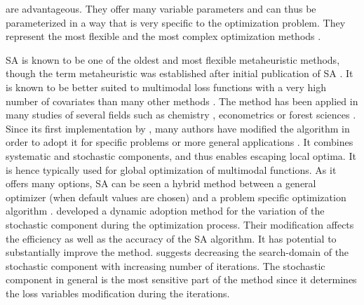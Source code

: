 are advantageous. They offer many variable parameters and can thus be parameterized in a way that is very specific to the optimization problem. They represent the most flexible and the most complex optimization methods \citep{blum_2003}.

SA \citep{kirkpatrick_1983} is known to be one of the oldest and most flexible metaheuristic methods, though the term metaheuristic was established after initial publication of SA \citep{blum_2003}.  It is known to be better suited to multimodal loss functions with a very high number of covariates than many other methods \citep{corana_1987}. The method has been applied in many studies of several fields such as chemistry \citep{agostini_2006}, econometrics \citep{ingber_1993} or forest sciences \citep{baskent_2002, boston_1999}. Since its first implementation by \citet{kirkpatrick_1983}, many authors have modified the algorithm in order to adopt it for specific problems \citep[e.g.][]{desarbo_1989, goffe_1996} or more general applications \citep[e.g.][]{xiang_2013}. It combines systematic and stochastic components, and thus enables escaping local optima. It is hence typically used for global optimization of multimodal functions. As it offers many options, SA can be seen a hybrid method between a general optimizer (when default values are chosen) and a problem specific optimization algorithm \citep{wegener_2005}. \citet{corana_1987} developed a dynamic adoption method for the variation of the stochastic component during the optimization process. Their modification affects the efficiency as well as the accuracy of the SA algorithm. It has potential to substantially improve the method. \citet{pronzato_1984} suggests decreasing the search-domain of the stochastic component with increasing number of iterations. The stochastic component in general is the most sensitive part of the method since it determines the loss variables modification during the iterations.


